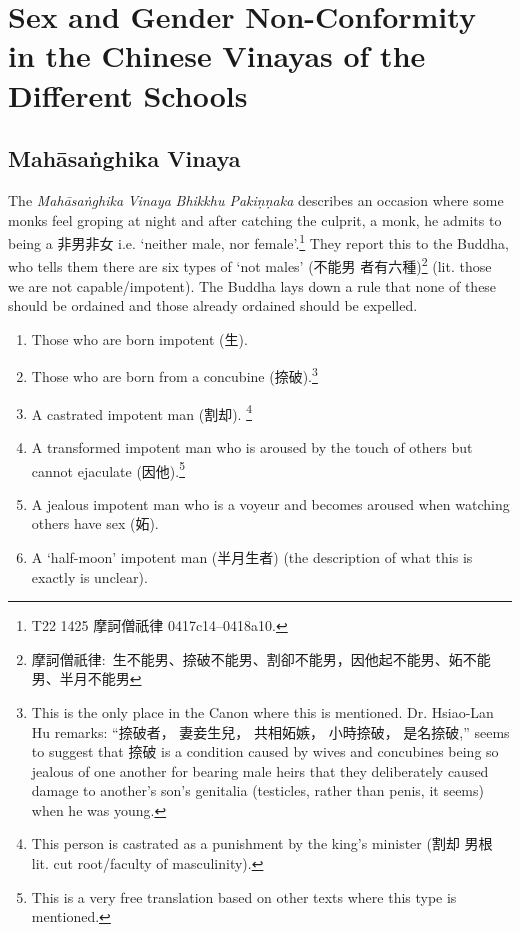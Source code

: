 \section{Sex and Gender Non-Conformity in the Chinese Vinayas of the Different Schools}
\label{appendix1}

\subsection{Mahāsaṅghika Vinaya}
The \textit{Mahāsaṅghika} \textit{Vinaya} \textit{Bhikkhu Pakiṇṇaka} describes an occasion where some monks feel groping at night and after catching the culprit, a monk, he admits to being a 非男非女 i.e. `neither male, nor female'.\footnote{T22 1425 摩訶僧祇律 0417c14–0418a10.} They report this to the Buddha, who tells them there are six types of `not males' (不能男 者有六種)\footnote{摩訶僧祇律: 生不能男、捺破不能男、割卻不能男，因他起不能男、妬不能男、半月不能男} (lit. those we are not capable/impotent). The Buddha lays down a rule that none of these should be ordained and those already ordained should be expelled.

\begin{enumerate}
\item Those who are born impotent (生). 
\item Those who are born from a concubine (捺破).\footnote{This is the only place in the Canon where this is mentioned. Dr. Hsiao-Lan Hu remarks: ``捺破者， 妻妾生兒， 共相妬嫉， 小時捺破， 是名捺破,'' seems to suggest that 捺破 is a condition caused by wives and concubines being so jealous of one another for bearing male heirs that they deliberately caused damage to another's son's genitalia (testicles, rather than penis, it seems) when he was young.} 
\item A castrated impotent man (割却). \footnote{This person is castrated as a punishment by the king's minister (割却 男根 lit. cut root/faculty of masculinity).}
\item A transformed impotent man who is aroused by the touch of others but cannot ejaculate (因他).\footnote{This is a very free translation based on other texts where this type is mentioned.}
\item A jealous impotent man who is a voyeur and becomes aroused when watching others have sex (妬).
\item A `half-moon' impotent man (半月生者) (the description of what this is exactly is unclear).
\end{enumerate}

